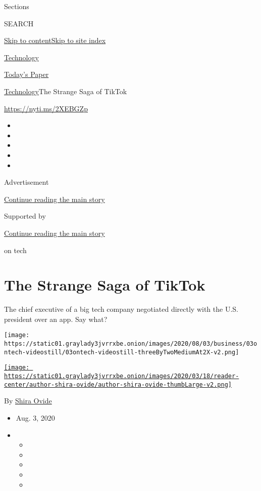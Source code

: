 Sections

SEARCH

\protect\hyperlink{site-content}{Skip to
content}\protect\hyperlink{site-index}{Skip to site index}

\href{https://www.nytimes3xbfgragh.onion/section/technology}{Technology}

\href{https://myaccount.nytimes3xbfgragh.onion/auth/login?response_type=cookie\&client_id=vi}{}

\href{https://www.nytimes3xbfgragh.onion/section/todayspaper}{Today's
Paper}

\href{/section/technology}{Technology}\textbar{}The Strange Saga of
TikTok

\href{https://nyti.ms/2XEBGZp}{https://nyti.ms/2XEBGZp}

\begin{itemize}
\item
\item
\item
\item
\item
\end{itemize}

Advertisement

\protect\hyperlink{after-top}{Continue reading the main story}

Supported by

\protect\hyperlink{after-sponsor}{Continue reading the main story}

on tech

\hypertarget{the-strange-saga-of-tiktok}{%
\section{The Strange Saga of TikTok}\label{the-strange-saga-of-tiktok}}

The chief executive of a big tech company negotiated directly with the
U.S. president over an app. Say what?

\texttt{[image: https://static01.graylady3jvrrxbe.onion/images/2020/08/03/business/03ontech-videostill/03ontech-videostill-threeByTwoMediumAt2X-v2.png]}

\href{https://www.nytimes3xbfgragh.onion/by/shira-ovide}{\texttt{[image: https://static01.graylady3jvrrxbe.onion/images/2020/03/18/reader-center/author-shira-ovide/author-shira-ovide-thumbLarge-v2.png]}}

By \href{https://www.nytimes3xbfgragh.onion/by/shira-ovide}{Shira Ovide}

\begin{itemize}
\item
  Aug. 3, 2020
\item
  \begin{itemize}
  \item
  \item
  \item
  \item
  \item
  \end{itemize}
\end{itemize}

